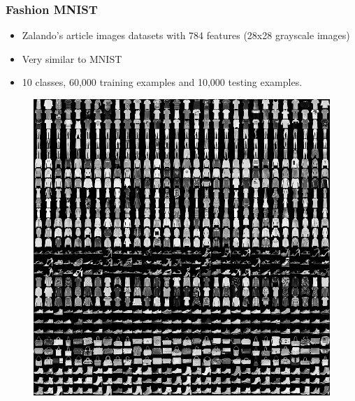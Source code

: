 \documentclass{beamer}
\begin{document}
\begin{frame}\frametitle{Fashion MNIST}
\begin{itemize}
\item Zalando's article images datasets
with 784 features (28x28 grayscale images)
\item Very similar to MNIST
\item 10 classes, 60,000 training examples and
10,000 testing examples.
\end{itemize}
\begin{figure}[h]
	\includegraphics[scale=0.25]{figures/fashion-mnist}
	\centering
	\label{fig:fashionmnist}
\end{figure}
\end{frame}
\end{document}
